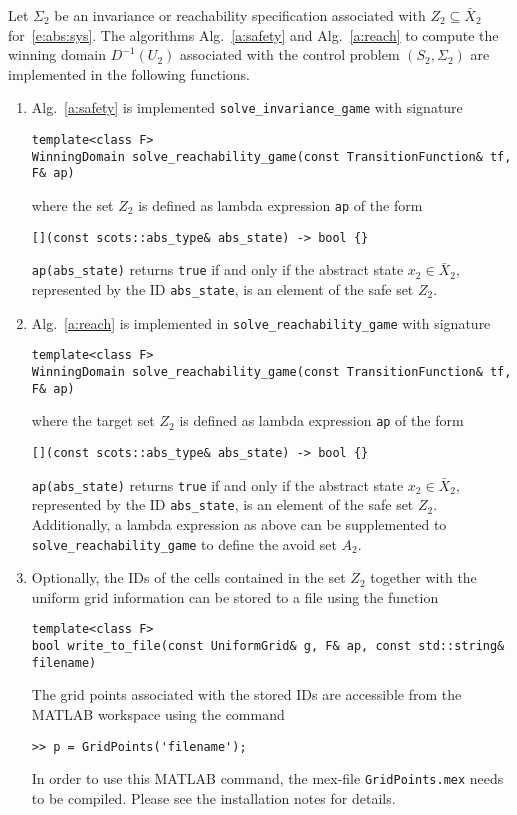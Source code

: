 \documentclass[a4paper]{amsart}
\begin{document}
Let $\Sigma_2$ be an invariance or reachability specification associated with $Z_2\subseteq \bar
X_2$ for~\eqref{e:abs:sys}.
The algorithms Alg.~\ref{a:safety} and Alg.~\ref{a:reach} to compute the winning
domain $D^{-1}(U_2)$ associated with the control problem $(S_2,\Sigma_2)$
are implemented in the following functions.
\begin{enumerate}
  \item Alg.~\ref{a:safety} is implemented {\tt solve\_invariance\_game} with signature 
\begin{lstlisting}[basicstyle=\small\ttfamily]
template<class F> 
WinningDomain solve_reachability_game(const TransitionFunction& tf, F& ap)
\end{lstlisting}
  where the set $Z_2$ is defined as lambda expression {\tt ap} of the form
\begin{lstlisting}[basicstyle=\small\ttfamily]
[](const scots::abs_type& abs_state) -> bool {}
\end{lstlisting}
  {\tt ap(abs\_state)} returns {\tt true} if and only if the abstract state $x_2\in\bar X_2$, represented by
  the ID {\tt abs\_state}, is  an element of the safe set $Z_2$.

  \item Alg.~\ref{a:reach} is implemented in {\tt solve\_reachability\_game} with signature 
\begin{lstlisting}[basicstyle=\small\ttfamily]
template<class F>
WinningDomain solve_reachability_game(const TransitionFunction& tf, F& ap)
\end{lstlisting}
  where the target set $Z_2$ is defined as lambda expression {\tt ap} of the
  form
\begin{lstlisting}[basicstyle=\small\ttfamily]
[](const scots::abs_type& abs_state) -> bool {}
\end{lstlisting}
  {\tt ap(abs\_state)} returns {\tt true} if and only if the abstract state $x_2\in\bar X_2$, represented by
  the ID {\tt abs\_state}, is  an element of the safe set $Z_2$. Additionally, a
  lambda expression as above can be supplemented to {\tt
  solve\_reachability\_game} to define the avoid set $A_2$.

  \item Optionally, the IDs of the cells contained in the set $Z_2$ together
  with the uniform grid information can be stored to a file using the function
\begin{lstlisting}[basicstyle=\small\ttfamily]
template<class F>
bool write_to_file(const UniformGrid& g, F& ap, const std::string& filename)
\end{lstlisting}
The grid points associated with the stored IDs are accessible from the MATLAB
workspace using the command
\begin{lstlisting}[basicstyle=\small\ttfamily]
>> p = GridPoints('filename');
\end{lstlisting}
In order to use this MATLAB command, the mex-file {\tt GridPoints.mex} needs to
be compiled. Please see the installation notes for details.

\end{enumerate}
\end{document}
